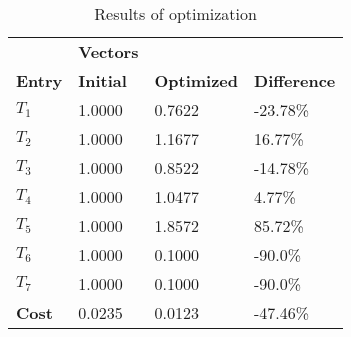 \begin{table}[H]
\centering
\begin{tabular}{llll}
\textbf{}      & \cellcolor[HTML]{EFEFEF}\textbf{Vectors} & \textbf{} & \textbf{}         \\
\rowcolor[HTML]{EFEFEF} 
\textbf{Entry} & \textbf{Initial} & \textbf{Optimized} & \textbf{Difference} \\
$T_1$ & 1.0000 & 0.7622 & -23.78\% \\ 
$T_2$ & 1.0000 & 1.1677 & 16.77\% \\ 
$T_3$ & 1.0000 & 0.8522 & -14.78\% \\ 
$T_4$ & 1.0000 & 1.0477 & 4.77\% \\ 
$T_5$ & 1.0000 & 1.8572 & 85.72\% \\ 
$T_6$ & 1.0000 & 0.1000 & -90.0\% \\ 
$T_7$ & 1.0000 & 0.1000 & -90.0\% \\ 
\rowcolor[HTML]{EFEFEF} 
\textbf{Cost}  & 0.0235 & 0.0123 & -47.46\% \\ 
\end{tabular}
\caption{Results of optimization}
\label{tab:OptimizationAnalysis}
\end{table}